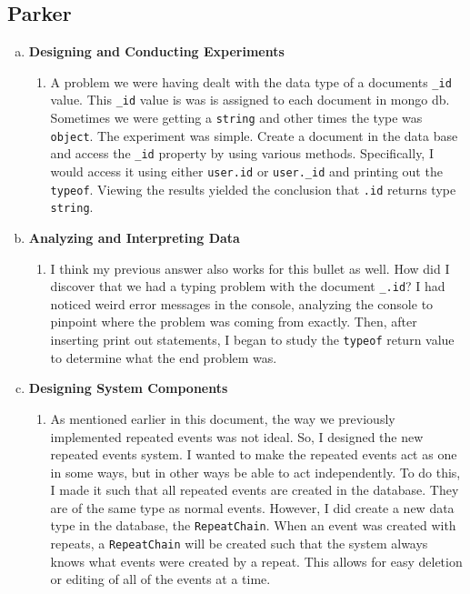 \documentclass[11pt]{article}   %
\begin{document}
\subsection*{Parker}

\begin{enumerate} [a)]
\item  {\bf Designing and Conducting Experiments}
\begin{enumerate} [$\cdot$]
\item A problem we were having dealt with the data type of a documents \texttt{\_id} value. This \texttt{\_id} value is was is assigned to each document in mongo db. Sometimes we were getting a \texttt{string} and other times the type was \texttt{object}. The experiment was simple. Create a document in the data base and access the \texttt{\_id} property by using various methods. Specifically, I would access it using either \texttt{user.id} or \texttt{user.\_id} and printing out the \texttt{typeof}. Viewing the results yielded the conclusion that \texttt{.id} returns type \texttt{string}.
\end{enumerate}
\item  {\bf Analyzing and Interpreting Data}
\begin{enumerate} [$\cdot$]
\item I think my previous answer also works for this bullet as well. How did I discover that we had a typing problem with the document \texttt{\_.id}? I had noticed weird error messages in the console, analyzing the console to pinpoint where the problem was coming from exactly. Then, after inserting print out statements, I began to study the \texttt{typeof} return value to determine what the end problem was. 
\end{enumerate}
\item {\bf Designing System Components}
\begin{enumerate} [$\cdot$]
\item As mentioned earlier in this document, the way we previously implemented repeated events was not ideal. So, I designed the new repeated events system. I wanted to make the repeated events act as one in some ways, but in other ways be able to act independently. To do this, I made it such that all repeated events are created in the database. They are of the same type as normal events. However, I did create a new data type in the database, the \texttt{RepeatChain}. When an event was created with repeats, a \texttt{RepeatChain} will be created such that the system always knows what events were created by a repeat. This allows for easy deletion or editing of all of the events at a time.

\end{enumerate}
\end{enumerate}
\end{document}
